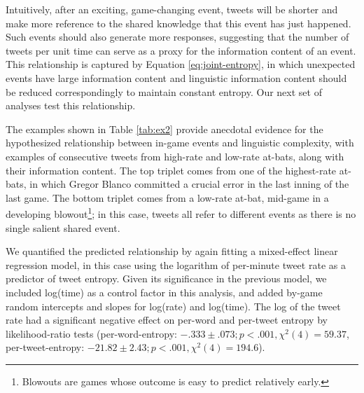 \documentclass[11pt,letterpaper]{article}
\begin{document}
Intuitively, after an exciting, game-changing event, tweets will be shorter and make more reference to the shared knowledge that this event has just happened. Such events should also generate more responses, suggesting that the number of tweets per unit time can serve as a proxy for the information content of an event. This relationship is captured by Equation \ref{eq:joint-entropy}, in which unexpected events have large information content and linguistic information content should be reduced correspondingly to maintain constant entropy. Our next set of analyses test this relationship. 

The examples shown in Table \ref{tab:ex2} provide anecdotal evidence for the hypothesized relationship between in-game events and linguistic complexity, with examples of consecutive tweets from high-rate and low-rate at-bats, along with their information content. The top triplet comes from one of the highest-rate at-bats, in which Gregor Blanco committed a crucial error in the last inning of the last game.  The bottom triplet comes from a low-rate at-bat, mid-game in a developing blowout\footnote{Blowouts are games whose outcome is easy to predict relatively early.}; in this case, tweets all refer to different events as there is no single salient shared event.


We quantified the predicted relationship by again fitting a mixed-effect linear regression model, in this case using the logarithm of per-minute tweet rate as a predictor of tweet entropy.  Given its significance in the previous model, we included log(time) as a control factor in this analysis, and added by-game random intercepts and slopes for log(rate) and log(time).  The log of the tweet rate had a significant negative effect on per-word and per-tweet entropy by likelihood-ratio tests (per-word-entropy: $-.333 \pm .073; p<.001, \chi^2(4)=59.37$, per-tweet-entropy: $-21.82 \pm 2.43; p<.001, \chi^2(4)=194.6$). 
\end{document}
